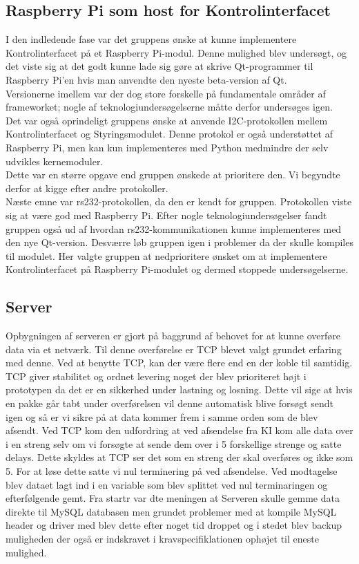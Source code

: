 
\subsection{Raspberry Pi som host for Kontrolinterfacet}
I den indledende fase var det gruppens ønske at kunne implementere Kontrolinterfacet på et Raspberry Pi-modul. Denne mulighed blev undersøgt, og det viste sig at det godt kunne lade sig gøre at skrive Qt-programmer til Raspberry Pi'en hvis man anvendte den nyeste beta-version af Qt.\\
Versionerne imellem var der dog store forskelle på fundamentale områder af frameworket; nogle af teknologiundersøgelserne måtte derfor undersøges igen.\\
Det var også oprindeligt gruppens ønske at anvende I2C-protokollen mellem Kontrolinterfacet og Styringsmodulet. Denne protokol er også understøttet af Raspberry Pi, men kan kun implementeres med Python medmindre der selv udvikles kernemoduler.\\
Dette var en større opgave end gruppen ønskede at prioritere den. Vi begyndte derfor at kigge efter andre protokoller.\\
Næste emne var rs232-protokollen, da den er kendt for gruppen. Protokollen viste sig at være god med Raspberry Pi. Efter nogle teknologiundersøgelser fandt gruppen også ud af hvordan rs232-kommunikationen kunne implementeres med den nye Qt-version.
Desværre løb gruppen igen i problemer da der skulle kompiles til modulet. Her valgte gruppen at nedprioritere ønsket om at implementere Kontrolinterfacet på Raspberry Pi-modulet og dermed stoppede undersøgelserne.

\subsection{Server}
Opbygningen af serveren er gjort på baggrund af behovet for at kunne overføre data via et netværk. Til denne overførelse er TCP blevet valgt grundet erfaring med denne. Ved at benytte TCP, kan der være flere end en der koble til samtidig. TCP giver stabilitet og ordnet levering noget der blev prioriteret højt i prototypen da det er en sikkerhed under lastning og losning. Dette vil sige at hvis en pakke går tabt under overførelsen vil denne automatisk blive forsøgt sendt igen og så er vi sikre på at data kommer frem i samme orden som de blev afsendt. 
Ved TCP kom den udfordring at ved afsendelse fra KI kom alle data over i en streng selv om vi forsøgte at sende dem over i 5 forskellige strenge og satte delays. Dette skyldes at TCP ser det som en streng der skal overføres og ikke som 5. For at løse dette satte vi nul terminering på ved afsendelse. Ved modtagelse blev dataet lagt ind i en variable som blev splittet ved nul terminaringen og efterfølgende gemt. Fra startr var dte meningen at Serveren skulle gemme data direkte til MySQL databasen men grundet problemer med at kompile MySQL header og driver med blev dette efter noget tid droppet og i stedet blev backup muligheden der også er indskravet i kravspecifiklationen ophøjet til eneste mulighed.

